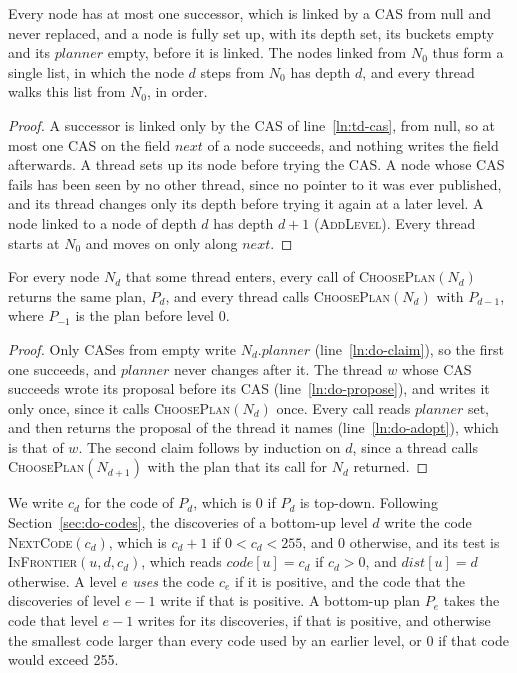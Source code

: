 \begin{lemma}
\label{lem:list}
Every node has at most one successor, which is linked by a CAS from null and never replaced, and a node is fully set up, with its depth set, its buckets empty and its $\mathit{planner}$ empty, before it is linked. The nodes linked from $N_0$ thus form a single list, in which the node $d$ steps from $N_0$ has depth $d$, and every thread walks this list from $N_0$, in order.
\end{lemma}
\begin{proof}
A successor is linked only by the CAS of line~\ref{ln:td-cas}, from null, so at most one CAS on the field $\mathit{next}$ of a node succeeds, and nothing writes the field afterwards. A thread sets up its node before trying the CAS. A node whose CAS fails has been seen by no other thread, since no pointer to it was ever published, and its thread changes only its depth before trying it again at a later level. A node linked to a node of depth $d$ has depth $d+1$ (\textsc{AddLevel}). Every thread starts at $N_0$ and moves on only along $\mathit{next}$.
\end{proof}

\begin{lemma}[Plans]
\label{lem:plans}
For every node $N_d$ that some thread enters, every call of \textsc{ChoosePlan}$(N_d)$ returns the same plan, $P_d$, and every thread calls \textsc{ChoosePlan}$(N_d)$ with $P_{d-1}$, where $P_{-1}$ is the plan before level 0.
\end{lemma}
\begin{proof}
Only CASes from empty write $N_d.\mathit{planner}$ (line~\ref{ln:do-claim}), so the first one succeeds, and $\mathit{planner}$ never changes after it. The thread $w$ whose CAS succeeds wrote its proposal before its CAS (line~\ref{ln:do-propose}), and writes it only once, since it calls \textsc{ChoosePlan}$(N_d)$ once. Every call reads $\mathit{planner}$ set, and then returns the proposal of the thread it names (line~\ref{ln:do-adopt}), which is that of $w$. The second claim follows by induction on $d$, since a thread calls \textsc{ChoosePlan}$(N_{d+1})$ with the plan that its call for $N_d$ returned.
\end{proof}

We write $c_d$ for the code of $P_d$, which is 0 if $P_d$ is top-down. Following Section~\ref{sec:do-codes}, the discoveries of a bottom-up level $d$ write the code \textsc{NextCode}$(c_d)$, which is $c_d + 1$ if $0 < c_d < 255$, and 0 otherwise, and its test is \textsc{InFrontier}$(u, d, c_d)$, which reads $\mathit{code}[u] = c_d$ if $c_d > 0$, and $\mathit{dist}[u] = d$ otherwise. A level $e$ \emph{uses} the code $c_e$ if it is positive, and the code that the discoveries of level $e-1$ write if that is positive. A bottom-up plan $P_e$ takes the code that level $e-1$ writes for its discoveries, if that is positive, and otherwise the smallest code larger than every code used by an earlier level, or 0 if that code would exceed 255.

